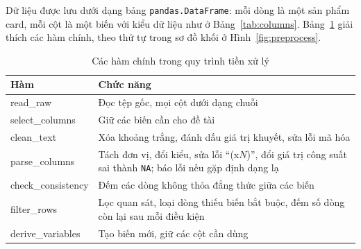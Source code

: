 Dữ liệu được lưu dưới dạng bảng \texttt{pandas.DataFrame}: mỗi dòng là một sản phẩm card, mỗi
cột là một biến với kiểu dữ liệu như ở Bảng~\ref{tab:columns}. Bảng~\ref{tab:functions}
giải thích các hàm chính, theo thứ tự trong sơ đồ khối ở Hình~\ref{fig:preprocess}.

\begin{table}[H]
  \centering
  \caption{Các hàm chính trong quy trình tiền xử lý}
  \label{tab:functions}
  \small
  \begin{tabularx}{\linewidth}{>{\ttfamily}l X}
    \toprule
    \normalfont\textbf{Hàm} & \textbf{Chức năng} \\
    \midrule
    read\_raw & Đọc tệp gốc, mọi cột dưới dạng chuỗi \\
    select\_columns & Giữ các biến cần cho đề tài \\
    clean\_text & Xóa khoảng trắng, đánh dấu giá trị khuyết, sửa lỗi mã hóa \\
    parse\_columns & Tách đơn vị, đổi kiểu, sửa lỗi ``(x$N$)'', đổi giá trị công suất sai
      thành \texttt{NA}; báo lỗi nếu gặp định dạng lạ \\
    check\_consistency & Đếm các dòng không thỏa đẳng thức giữa các biến \\
    filter\_rows & Lọc quan sát, loại dòng thiếu biến bắt buộc, đếm số dòng còn lại sau
      mỗi điều kiện \\
    derive\_variables & Tạo biến mới, giữ các cột cần dùng \\
    \bottomrule
  \end{tabularx}
\end{table}
